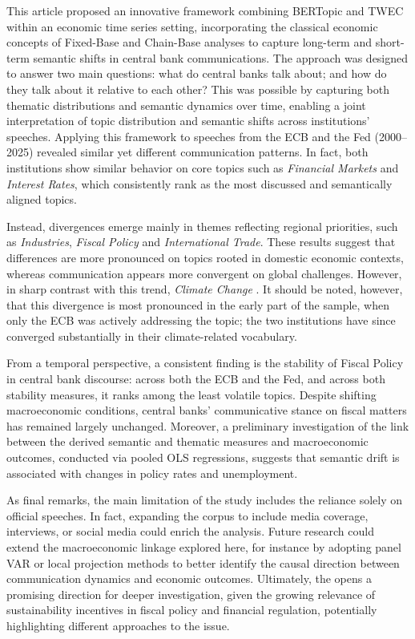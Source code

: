 This article proposed an innovative framework combining BERTopic and TWEC within an economic time series setting, incorporating the classical economic concepts of Fixed-Base and Chain-Base analyses to capture long-term and short-term semantic shifts in central bank communications. The approach was designed to answer two main questions: what do central banks talk about; and how do they talk about it relative to each other? This was possible by capturing both thematic distributions and semantic dynamics over time, enabling a joint interpretation of topic distribution and semantic shifts across institutions' speeches. Applying this framework to speeches from the ECB and the Fed (2000–2025) revealed similar yet different communication patterns. In fact, both institutions show similar behavior on core topics such as \textit{Financial Markets} and \textit{Interest Rates}, which consistently rank as the most discussed and semantically aligned topics.

Instead, divergences emerge mainly in themes reflecting regional priorities, such as \textit{Industries}, \textit{Fiscal Policy} and \textit{International Trade}. These results suggest that differences are more pronounced on topics rooted in domestic economic contexts, whereas communication appears more convergent on global challenges. However, in sharp contrast with this trend, \textit{Climate Change} . It should be noted, however, that this divergence is most pronounced in the early part of the sample, when only the ECB was actively addressing the topic; the two institutions have since converged substantially in their climate-related vocabulary.

From a temporal perspective, a consistent finding is the stability of Fiscal Policy in central bank discourse: across both the ECB and the Fed, and across both stability measures, it ranks among the least volatile topics. Despite shifting macroeconomic conditions, central banks' communicative stance on fiscal matters has remained largely unchanged. Moreover, a preliminary investigation of the link between the derived semantic and thematic measures and macroeconomic outcomes, conducted via pooled OLS regressions, suggests that semantic drift is associated with  changes in policy rates and unemployment.

As final remarks, the main limitation of the study includes the reliance solely on official speeches. In fact, expanding the corpus to include media coverage, interviews, or social media could enrich the analysis. Future research could extend the macroeconomic linkage explored here, for instance by adopting panel VAR or local projection methods to better identify the causal direction between communication dynamics and economic outcomes. Ultimately, the  opens a promising direction for deeper investigation, given the growing relevance of sustainability incentives in fiscal policy and financial regulation, potentially highlighting different approaches to the issue.

